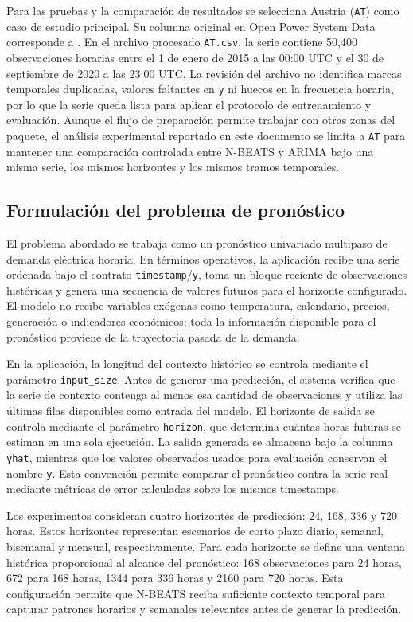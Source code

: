 Para las pruebas y la comparación de resultados se selecciona Austria (\texttt{AT}) como caso de estudio principal. Su columna original en Open Power System Data corresponde a . En el archivo procesado \texttt{AT.csv}, la serie contiene 50,400 observaciones horarias entre el 1 de enero de 2015 a las 00:00 UTC y el 30 de septiembre de 2020 a las 23:00 UTC. La revisión del archivo no identifica marcas temporales duplicadas, valores faltantes en \texttt{y} ni huecos en la frecuencia horaria, por lo que la serie queda lista para aplicar el protocolo de entrenamiento y evaluación. Aunque el flujo de preparación permite trabajar con otras zonas del paquete, el análisis experimental reportado en este documento se limita a \texttt{AT} para mantener una comparación controlada entre N-BEATS y ARIMA bajo una misma serie, los mismos horizontes y los mismos tramos temporales.

\subsection{Formulación del problema de pronóstico}

El problema abordado se trabaja como un pronóstico univariado multipaso de demanda eléctrica horaria. En términos operativos, la aplicación recibe una serie ordenada bajo el contrato \texttt{timestamp}/\texttt{y}, toma un bloque reciente de observaciones históricas y genera una secuencia de valores futuros para el horizonte configurado. El modelo no recibe variables exógenas como temperatura, calendario, precios, generación o indicadores económicos; toda la información disponible para el pronóstico proviene de la trayectoria pasada de la demanda.

En la aplicación, la longitud del contexto histórico se controla mediante el parámetro \texttt{input\_size}. Antes de generar una predicción, el sistema verifica que la serie de contexto contenga al menos esa cantidad de observaciones y utiliza las últimas filas disponibles como entrada del modelo. El horizonte de salida se controla mediante el parámetro \texttt{horizon}, que determina cuántas horas futuras se estiman en una sola ejecución. La salida generada se almacena bajo la columna \texttt{yhat}, mientras que los valores observados usados para evaluación conservan el nombre \texttt{y}. Esta convención permite comparar el pronóstico contra la serie real mediante métricas de error calculadas sobre los mismos timestamps.

Los experimentos consideran cuatro horizontes de predicción: 24, 168, 336 y 720 horas. Estos horizontes representan escenarios de corto plazo diario, semanal, bisemanal y mensual, respectivamente. Para cada horizonte se define una ventana histórica proporcional al alcance del pronóstico: 168 observaciones para 24 horas, 672 para 168 horas, 1344 para 336 horas y 2160 para 720 horas. Esta configuración permite que N-BEATS reciba suficiente contexto temporal para capturar patrones horarios y semanales relevantes antes de generar la predicción.

